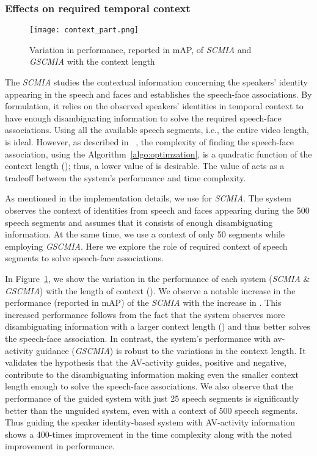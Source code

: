 \subsubsection{Effects on required temporal context}
\begin{figure}[]
    \centering
    \texttt{[image: context\_part.png]}
    \caption{Variation in performance, reported in mAP, of \emph{SCMIA} and \emph{GSCMIA} with the context length }
    \label{fig:context}
\end{figure}
The \emph{SCMIA} studies the contextual information concerning the speakers' identity appearing in the speech and faces and establishes the speech-face associations. By formulation, it relies on the observed speakers' identities in temporal context to have enough disambiguating information to solve the required speech-face associations. Using all the available speech segments, i.e., the entire video length, is ideal. However, as described in ~\cite{sharma2022unsupervised}, the complexity of finding the speech-face association, using the Algorithm~\ref{algo:optimzation}, is a quadratic function of the context length (); thus, a lower value of  is desirable. The value of  acts as a tradeoff between the system's performance and time complexity.

As mentioned in the implementation details, we use  for \emph{SCMIA}. The system observes the context of identities from speech and faces appearing during the 500 speech segments and assumes that it consists of enough disambiguating information. At the same time, we use a context of only 50 segments  while employing \emph{GSCMIA}. Here we explore the role of required context of speech segments to solve speech-face associations.

In Figure~\ref{fig:context}, we show the variation in the performance of each system (\emph{SCMIA} \& \emph{GSCMIA}) with the length of context (). We observe a notable increase in the performance (reported in mAP) of the \emph{SCMIA} with the increase in . This increased performance follows from the fact that the system observes more disambiguating information with a larger context length () and thus better solves the speech-face association. In contrast, the system's performance with av-activity guidance (\emph{GSCMIA}) is robust to the variations in the context length. It validates the hypothesis that the AV-activity guides, positive and negative, contribute to the disambiguating information making even the smaller context length enough to solve the speech-face associations. We also observe that the performance of the guided system with just 25 speech segments is significantly better than the unguided system, even with a context of 500 speech segments. Thus guiding the speaker identity-based system with AV-activity information shows a 400-times improvement in the time complexity along with the noted improvement in performance. 
